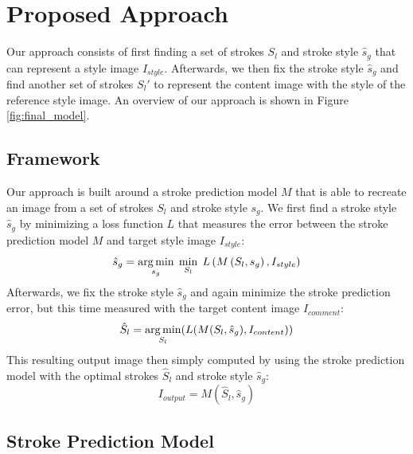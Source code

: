 \documentclass{mva_style}
\begin{document}
\section{Proposed Approach}

Our approach consists of first finding a set of strokes $S_l$ and stroke style
$\hat{s}_g$ that can represent a style image $I_{style}$. Afterwards, we then fix the
stroke style $\hat{s}_g$ and find another set of strokes $S_l'$ to represent the
content image with the style of the reference style image.
An overview of our approach is shown in Figure \ref{fig:final_model}.

\subsection{Framework}

Our approach is built around a stroke prediction model $M$ that is able to
recreate an image from a set of strokes $S_l$ and stroke style $s_g$.
We first find a stroke style $\hat{s}_g$ by minimizing a loss function $L$ that
measures the error between the stroke prediction model $M$ and target style
image $I_{style}$:
\begin{equation}
  \hat{s}_g = \operatorname*{arg\,min}_{s_g} \;
      \min_{S_l} \;
         L\left( M\left(S_l, s_g\right), I_{style}\right)
  \label{eq_first}
\end{equation}
Afterwards, we fix the stroke style $\hat{s}_g$ and again minimize the stroke
prediction error, but this time measured with the target content image
$I_{comment}$:
\begin{equation}
  \hat{S}_l = \operatorname*{arg\,min}_{S_l} (L(M(S_l, \hat{s}_g), I_{content}))
  \label{eq_second}
\end{equation}
This resulting output image then simply computed by using the stroke prediction
model with the optimal strokes $\hat{S}_l$ and stroke style $\hat{s}_g$:
\begin{equation}
   I_{output} = M( \hat{S}_l, \hat{s}_g )
\end{equation}

\subsection{Stroke Prediction Model}
\end{document}

